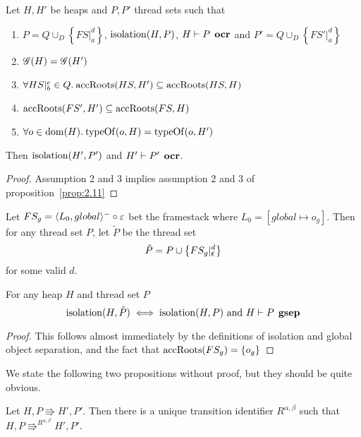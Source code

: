 \begin{corollary} \label{cor:2.11}
  Let $H, H'$ be heaps and $P, P'$ thread sets such that
  \begin{enumerate}
    \item $P = Q \cup_D \left\{ FS|_a^d \right\}$, $\mbox{$\mathrm{isolation}$}{(H, P)}$, $H
      \vdash P \:\: \mbox{\bf ocr}$ and $P' = Q \cup_D \left\{ FS'|_a^d \right\}$
    \item $\mathscr{G}{(H)} = \mathscr{G}{(H')}$
    \item $\forall HS|_b^e \in Q. \: \mbox{$\mathrm{accRoots}$}{(HS, H')} \subseteq \mbox{$\mathrm{accRoots}$}{(HS, H)}$
    \item $\mbox{$\mathrm{accRoots}$}{(FS', H')} \subseteq \mbox{$\mathrm{accRoots}$}{(FS, H)}$
    \item $\forall o \in \mbox{$\mathrm{dom}$}{(H)}. \: \mbox{$\mathrm{typeOf}$}{(o, H)} = \mbox{$\mathrm{typeOf}$}{(o, H')}$
  \end{enumerate}
  Then $\mbox{$\mathrm{isolation}$}{(H', P')}$ and $H' \vdash P' \:\: \mbox{\bf ocr}$.
\end{corollary}

\begin{proof}
  Assumption 2 and 3 implies assumption 2 and 3 of
  proposition~\ref{prop:2.11}
\end{proof}

\begin{definition} \label{def:ptilde}
  Let $FS_g = \mbox{$\langle L_0, global \rangle^{-}$} \circ \varepsilon$ bet the framestack where
  $L_0 = [global \mapsto o_g]$. Then for any thread set $P$, let $\tilde{P}$ be the
  thread set
  \begin{equation*}
    \tilde{P} = P \cup \left\{ FS_g|_{\mbox{$\epsilon$}}^d \right\}
  \end{equation*}
  for some valid $d$.
\end{definition}

\begin{proposition} \label{prop:2.8}
  For any heap $H$ and thread set $P$
  \begin{equation*}
    \mbox{$\mathrm{isolation}$}{(H, \tilde{P})} \iff \mbox{$\mathrm{isolation}$}{(H, P)} \text{ and } H \vdash P
    \:\: \mbox{\bf gsep} 
  \end{equation*}
\end{proposition}

\begin{proof}
  This follows almost immediately by the definitions of isolation and global
  object separation, and the fact that $\mbox{$\mathrm{accRoots}$}(FS_g) = \left\{
    o_g \right\}$ 
\end{proof}

We state the following two propositions without proof, but they should be quite
obvious.
\begin{proposition} \label{prop:uniq_trans}
  Let $H, P \Rrightarrow H', P'$. Then there is a unique transition identifier
  $R^{\alpha, \beta}$ such that $H, P \Rrightarrow^{R^{\alpha, \beta}} H', P'$.
\end{proposition}

